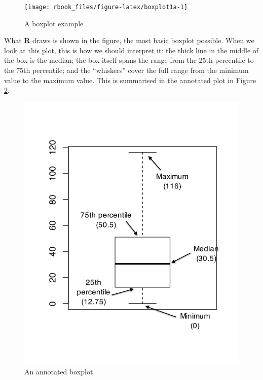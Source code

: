 \documentclass[]{book}
\newenvironment{Shaded}{\begin{snugshade}}{\end{snugshade}}
\newcommand{\DataTypeTok}[1]{\textcolor[rgb]{0.13,0.29,0.53}{#1}}
\newcommand{\KeywordTok}[1]{\textcolor[rgb]{0.13,0.29,0.53}{\textbf{#1}}}
\newcommand{\NormalTok}[1]{#1}
\newcommand{\OperatorTok}[1]{\textcolor[rgb]{0.81,0.36,0.00}{\textbf{#1}}}
\newcommand{\StringTok}[1]{\textcolor[rgb]{0.31,0.60,0.02}{#1}}
\begin{document}
\begin{Shaded}
\end{Shaded}

\begin{figure}

{\centering \texttt{[image: rbook\_files/figure-latex/boxplot1a-1]} 

}

\caption{A boxplot example}\label{fig:boxplot1a}
\end{figure}

What \textbf{R} draws is shown in the figure, the most basic boxplot possible. When we look at this plot, this is how we should interpret it: the thick line in the middle of the box is the median; the box itself spans the range from the 25th percentile to the 75th percentile; and the ``whiskers'' cover the full range from the minimum value to the maximum value. This is summarised in the annotated plot in Figure \ref{fig:boxplot1b}.

\begin{figure}

{\centering \includegraphics[width=8.33in]{figure/boxplot1_annotated} 

}

\caption{An annotated boxplot}\label{fig:boxplot1b}
\end{figure}
\end{document}
